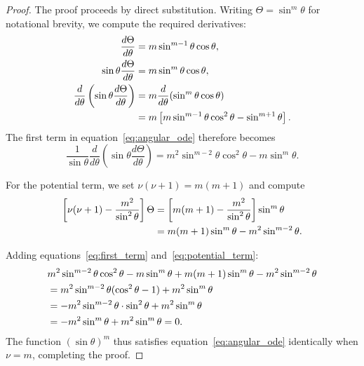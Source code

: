 \documentclass[
  aip,
  amsmath,amssymb,
  preprint
]{revtex4-1}
\begin{document}
\begin{proof}
The proof proceeds by direct substitution. Writing $\Theta = \sin^m\theta$ for notational brevity, we compute the required derivatives:
\begin{align}
\frac{d\Theta}{d\theta} &= m\sin^{m-1}\theta\cos\theta, \\
\sin\theta\frac{d\Theta}{d\theta} &= m\sin^m\theta\cos\theta, \\
\frac{d}{d\theta}\left(\sin\theta\frac{d\Theta}{d\theta}\right) &= m\frac{d}{d\theta}(\sin^m\theta\cos\theta) \notag \\
&= m\left[m\sin^{m-1}\theta\cos^2\theta - \sin^{m+1}\theta\right].
\end{align}
The first term in equation~\eqref{eq:angular_ode} therefore becomes
\begin{equation}
\frac{1}{\sin\theta}\frac{d}{d\theta}\left(\sin\theta\frac{d\Theta}{d\theta}\right) = m^2\sin^{m-2}\theta\cos^2\theta - m\sin^m\theta.
\label{eq:first_term}
\end{equation}

For the potential term, we set $\nu(\nu+1) = m(m+1)$ and compute
\begin{align}
\left[\nu(\nu+1) - \frac{m^2}{\sin^2\theta}\right]\Theta &= \left[m(m+1) - \frac{m^2}{\sin^2\theta}\right]\sin^m\theta \notag \\
&= m(m+1)\sin^m\theta - m^2\sin^{m-2}\theta.
\label{eq:potential_term}
\end{align}

Adding equations~\eqref{eq:first_term} and~\eqref{eq:potential_term}:
\begin{align}
&m^2\sin^{m-2}\theta\cos^2\theta - m\sin^m\theta + m(m+1)\sin^m\theta - m^2\sin^{m-2}\theta \notag \\
&= m^2\sin^{m-2}\theta(\cos^2\theta - 1) + m^2\sin^m\theta \notag \\
&= -m^2\sin^{m-2}\theta \cdot \sin^2\theta + m^2\sin^m\theta \notag \\
&= -m^2\sin^m\theta + m^2\sin^m\theta = 0.
\end{align}
The function $(\sin\theta)^m$ thus satisfies equation~\eqref{eq:angular_ode} identically when $\nu = m$, completing the proof.
\end{proof}
\end{document}
